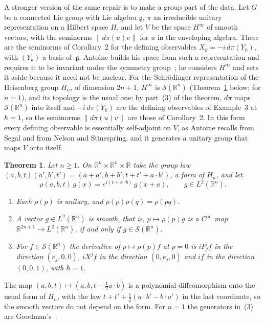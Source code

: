 \documentclass[11pt]{article}
\newtheorem{theorem}{Theorem}[section]
\theoremstyle{definition}
\begin{document}
A stronger version of the same repair is to make a group part of the data. Let $G$ be a
connected Lie group with Lie algebra $\mathfrak g$, $\pi$ an irreducible unitary representation
on a Hilbert space $H$, and let $V$ be the space $H^\infty$ of smooth vectors, with the seminorms
$\|d\pi(u)v\|$ for $u$ in the enveloping algebra. These are the seminorms of Corollary~2 for the
defining observables $X_k = -i\,d\pi(Y_k)$, with $(Y_k)$ a basis of~$\mathfrak g$. Antoine builds
his space from such a representation and requires it to be invariant under the symmetry
group~\cite{antoine2}; he considers $H^\infty$ and sets it aside because it need not be nuclear.
For the Schr\"odinger representation of the Heisenberg group $H_n$, of dimension $2n + 1$,
$H^\infty$ is $\mathcal S(\mathbb R^n)$ (Theorem~\ref{thm:smoothvectors} below;
\cite[Secs.~1 and~6]{goodman} for $n = 1$), and its topology is the usual one: by part~(3) of the
theorem, $d\pi$ maps $\mathcal S(\mathbb R^n)$ into itself and $-i\,d\pi(Y_k)$ are the defining
observables of Example~3 at $\hbar = 1$, so the seminorms $\|d\pi(u)v\|$ are those of
Corollary~2. In this form every defining observable is essentially
self-adjoint on $V$, as Antoine recalls from Segal and from Nelson and Stinespring, and it
generates a unitary group that maps $V$ onto itself.

\begin{theorem}\label{thm:smoothvectors}
  Let $n \ge 1$. On $\mathbb R^n \times \mathbb R^n \times \mathbb R$ take the group law
  $(a, b, t)(a', b', t') = (a + a', b + b', t + t' + a \cdot b')$, a form of $H_n$, and let
  \[
    \rho(a, b, t)\, g(x) = e^{i(t + x \cdot b)}\, g(x + a), \qquad g \in L^2(\mathbb R^n).
  \]
  \begin{enumerate}
    \item Each $\rho(p)$ is unitary, and $\rho(p)\rho(q) = \rho(pq)$.
    \item A vector $g \in L^2(\mathbb R^n)$ is smooth, that is, $p \mapsto \rho(p) g$ is a
      $C^\infty$ map $\mathbb R^{2n+1} \to L^2(\mathbb R^n)$, if and only if
      $g \in \mathcal S(\mathbb R^n)$.
    \item For $f \in \mathcal S(\mathbb R^n)$ the derivative of $p \mapsto \rho(p) f$ at $p = 0$
      is $i P_j f$ in the direction $(e_j, 0, 0)$, $i X^j f$ in the direction $(0, e_j, 0)$ and
      $i f$ in the direction $(0, 0, 1)$, with $\hbar = 1$.
  \end{enumerate}
\end{theorem}

The map $(a, b, t) \mapsto (a, b, t - \frac12 a \cdot b)$ is a polynomial diffeomorphism onto the
usual form of $H_n$, with the law $t + t' + \frac12(a \cdot b' - b \cdot a')$ in the last
coordinate, so the smooth vectors do not depend on the form. For $n = 1$ the generators in~(3)
are Goodman's~\cite[Sec.~6]{goodman}.
\end{document}
